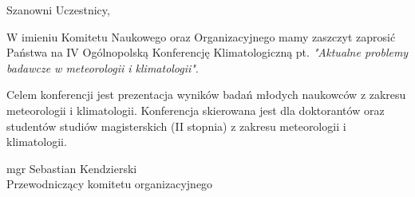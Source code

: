 \Large
\raggedright Szanowni Uczestnicy,

W imieniu Komitetu Naukowego oraz Organizacyjnego mamy zaszczyt zaprosić Państwa na IV
Ogólnopolską  Konferencję  Klimatologiczną pt. \emph{ "Aktualne    problemy    badawcze w meteorologii i klimatologii"}.

Celem  konferencji  jest  prezentacja  wyników  badań  młodych  naukowców  z  zakresu meteorologii  i  klimatologii. Konferencja  skierowana jest  dla  doktorantów  oraz  studentów  studiów magisterskich (II stopnia) z zakresu meteorologii i klimatologii. 


\vspace{4.5cm}

\large
\begin{flushright}
mgr Sebastian Kendzierski \\
Przewodniczący komitetu organizacyjnego \\ 
\end{flushright}
